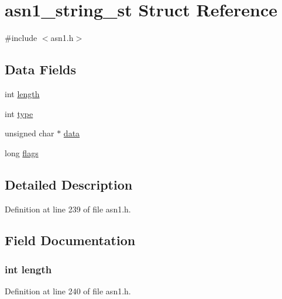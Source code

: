 \hypertarget{structasn1__string__st}{}\section{asn1\+\_\+string\+\_\+st Struct Reference}
\label{structasn1__string__st}


{\ttfamily \#include $<$asn1.\+h$>$}

\subsection*{Data Fields}
\begin{DoxyCompactItemize}
\item 
int \hyperlink{structasn1__string__st_a9f59b34b1f25fe00023291b678246bcc}{length}
\item 
int \hyperlink{structasn1__string__st_ac765329451135abec74c45e1897abf26}{type}
\item 
unsigned char $\ast$ \hyperlink{structasn1__string__st_a6f0f3eff16962881999799f7b0f66a0a}{data}
\item 
long \hyperlink{structasn1__string__st_a6a36e81b5744ff152979cae202d37e78}{flags}
\end{DoxyCompactItemize}


\subsection{Detailed Description}


Definition at line 239 of file asn1.\+h.



\subsection{Field Documentation}
\subsubsection[{\texorpdfstring{length}{length}}]{\setlength{\rightskip}{0pt plus 5cm}int length}\hypertarget{structasn1__string__st_a9f59b34b1f25fe00023291b678246bcc}{}\label{structasn1__string__st_a9f59b34b1f25fe00023291b678246bcc}


Definition at line 240 of file asn1.\+h.

